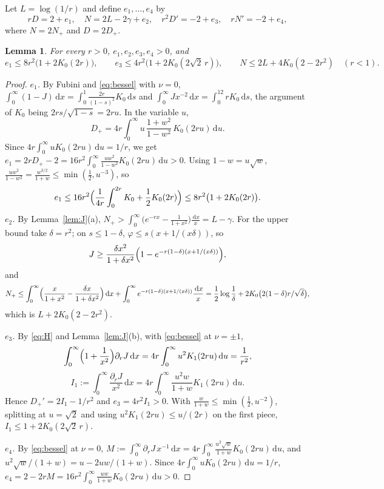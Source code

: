 \documentclass[11pt]{amsart}
\newtheorem{lemma}[theorem]{Lemma}
\theoremstyle{remark}
\numberwithin{equation}{section}
\newcommand{\dd}{\,\mathrm{d}}
\begin{document}
Let $L=\log(1/r)$ and define $e_1,\dots,e_4$ by
\[
rD=2+e_1,\quad N=2L-2\gamma+e_2,\quad r^2D'=-2+e_3,\quad rN'=-2+e_4,
\]
where $N=2N_+$ and $D=2D_+$.

\begin{lemma}\label{lem:e}
For every $r>0$, $e_1,e_2,e_3,e_4>0$, and
\[
e_1\le8r^2\bigl(1+2K_0(2r)\bigr),\qquad e_3\le4r^2\bigl(1+2K_0(2\sqrt2\,r)\bigr),\qquad N\le2L+4K_0(2-2r^2)\quad(r<1).
\]
\end{lemma}

\begin{proof}
\emph{$e_1$.} By Fubini and \eqref{eq:bessel} with $\nu=0$, $\int_0^\infty(1-J)\dd x=\int_0^1\frac{2r}{(1-s)^2}K_0\dd s$ and $\int_0^\infty Jx^{-2}\dd x=\int_0^12rK_0\dd s$, the argument of $K_0$ being $2rs/\sqrt{1-s}=2ru$. In the variable $u$,
\[
D_+=4r\int_0^\infty u\,\frac{1+w^2}{1-w^2}\,K_0(2ru)\dd u .
\]
Since $4r\int_0^\infty uK_0(2ru)\dd u=1/r$, we get $e_1=2rD_+-2=16r^2\int_0^\infty\frac{uw^2}{1-w^2}K_0(2ru)\dd u>0$. Using $1-w=u\sqrt w$, $\frac{uw^2}{1-w^2}=\frac{w^{3/2}}{1+w}\le\min(\frac12,u^{-3})$, so
\[
e_1\le16r^2\Bigl(\frac1{4r}\int_0^{2r}K_0+\frac12K_0(2r)\Bigr)\le8r^2\bigl(1+2K_0(2r)\bigr).
\]
\emph{$e_2$.} By Lemma~\ref{lem:J}(a), $N_+>\int_0^\infty\bigl(e^{-rx}-\frac1{1+x^2}\bigr)\frac{\dd x}x=L-\gamma$. For the upper bound take $\delta=r^2$; on $s\le1-\delta$, $\varphi\le s(x+1/(x\delta))$, so
\[
J\ge\frac{\delta x^2}{1+\delta x^2}\Bigl(1-e^{-r(1-\delta)(x+1/(x\delta))}\Bigr),
\]
and
\[
N_+\le\int_0^\infty\Bigl(\frac x{1+x^2}-\frac{\delta x}{1+\delta x^2}\Bigr)\dd x+\int_0^\infty e^{-r(1-\delta)(x+1/(x\delta))}\frac{\dd x}x=\frac12\log\frac1\delta+2K_0\bigl(2(1-\delta)r/\sqrt\delta\bigr),
\]
which is $L+2K_0(2-2r^2)$.

\emph{$e_3$.} By \eqref{eq:H} and Lemma~\ref{lem:J}(b), with \eqref{eq:bessel} at $\nu=\pm1$,
\begin{equation}\label{eq:e3id}
\int_0^\infty\Bigl(1+\frac1{x^2}\Bigr)\partial_rJ\dd x=4r\int_0^\infty u^2K_1(2ru)\dd u=\frac1{r^2},
\end{equation}
\[
I_1:=\int_0^\infty\frac{\partial_rJ}{x^2}\dd x=4r\int_0^\infty\frac{u^2w}{1+w}K_1(2ru)\dd u.
\]
Hence $D_+'=2I_1-1/r^2$ and $e_3=4r^2I_1>0$. With $\frac{w}{1+w}\le\min(\frac12,u^{-2})$, splitting at $u=\sqrt2$ and using $u^2K_1(2ru)\le u/(2r)$ on the first piece, $I_1\le1+2K_0(2\sqrt2\,r)$.

\emph{$e_4$.} By \eqref{eq:bessel} at $\nu=0$, $M:=\int_0^\infty\partial_rJ\,x^{-1}\dd x=4r\int_0^\infty\frac{u^2\sqrt w}{1+w}K_0(2ru)\dd u$, and $u^2\sqrt w/(1+w)=u-2uw/(1+w)$. Since $4r\int_0^\infty uK_0(2ru)\dd u=1/r$, $e_4=2-2rM=16r^2\int_0^\infty\frac{uw}{1+w}K_0(2ru)\dd u>0$.
\end{proof}
\end{document}
